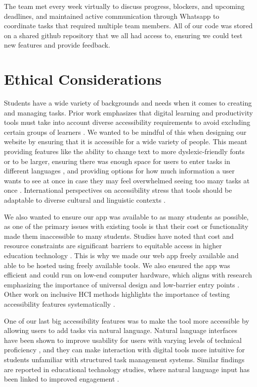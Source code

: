 \documentclass[11pt,oneside]{article}
\begin{document}
The team met every week virtually to discuss progress, blockers, and upcoming deadlines, and maintained active communication through Whatsapp to coordinate tasks that required multiple team members. All of our code was stored on a shared github repository that we all had access to, ensuring we could test new features and provide feedback.

\section{Ethical Considerations}
Students have a wide variety of backgrounds and needs when it comes to creating and managing tasks. Prior work emphasizes that digital learning and productivity tools must take into account diverse accessibility requirements to avoid excluding certain groups of learners \citep{seale2013learning}. We wanted to be mindful of this when designing our website by ensuring that it is accessible for a wide variety of people. This meant providing features like the ability to change text to more dyslexic-friendly fonts or to be larger, ensuring there was enough space for users to enter tasks in different languages \citep{al2016universal}, and providing options for how much information a user wants to see at once in case they may feel overwhelmed seeing too many tasks at once \citep{spina2019wcag}. International perspectives on accessibility stress that tools should be adaptable to diverse cultural and linguistic contexts \citep{world2011world}.

We also wanted to ensure our app was available to as many students as possible, as one of the primary issues with existing tools is that their cost or functionality made them inaccessible to many students. Studies have noted that cost and resource constraints are significant barriers to equitable access in higher education technology \citep{selwyn2021education}. This is why we made our web app freely available and able to be hosted using freely available tools. We also ensured the app was efficient and could run on low-end computer hardware, which aligns with research emphasizing the importance of universal design and low-barrier entry points \citep{rose2002teaching}. Other work on inclusive HCI methods highlights the importance of testing accessibility features systematically \citep{lazar2017research}.

One of our last big accessibility features was to make the tool more accessible by allowing users to add tasks via natural language.  Natural language interfaces have been shown to improve usability for users with varying levels of technical proficiency \citep{shneiderman2010designing}, and they can make interaction with digital tools more intuitive for students unfamiliar with structured task management systems. Similar findings are reported in educational technology studies, where natural language input has been linked to improved engagement \citep{junco2012relationship}.
\end{document}
